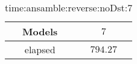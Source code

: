 \begin{table}[!ht]
	\centering
	\begin{tabular}{|c|c|}
		\hline
		Models & $7$ \\ \hline
		elapsed & $794.27$ \\ \hline
	\end{tabular}
	\caption{time:ansamble:reverse:noDst:7}
	\label{tab:time:ansamble:reverse:noDst:7}
\end{table}
